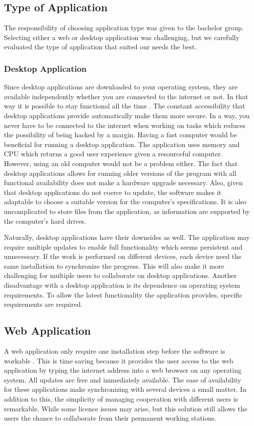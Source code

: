 \subsection{Type of Application}
The responsibility of choosing application type was given to the bachelor group. Selecting either a web or desktop application was challenging, but we carefully evaluated the type of application that suited our needs the best. 

\subsubsection*{Desktop Application}
Since desktop applications are downloaded to your operating system, they are available independently whether you are connected to the internet or not. In that way it is possible to stay functional all the time \cite{WebVsDesktop}. The constant accessibility that desktop applications provide automatically make them more secure. In a way, you never have to be connected to the internet when working on tasks which reduces the possibility of being hacked by a margin. Having a fast computer would be beneficial for running a desktop application. The application uses memory and CPU which returns a good user experience given a resourceful computer. However, using an old computer would not be a problem either. The fact that desktop applications allows for running older versions of the program with all functional availability does not make a hardware upgrade necessary. Also, given that desktop applications do not coerce to update, the software makes it adaptable to choose a suitable version for the computer's specifications. It is also uncomplicated to store files from the application, as information are supported by the computer's hard drives. 

Naturally, desktop applications have their downsides as well. The application may require multiple updates to enable full functionality which seems persistent and unnecessary. If the work is performed on different devices, each device need the same installation to synchronize the progress. This will also make it more challenging for multiple users to collaborate on desktop applications. Another disadvantage with a desktop application is its dependence on operating system requirements. To allow the latest functionality the application provides, specific requirements are required. 

\subsection*{Web Application}
A web application only require one installation step before the software is workable \cite{WebVsDesktop}. This is time saving because it provides the user access to the web application by typing the internet address into a web browser on any operating system. All updates are free and immediately available. The ease of availability for these applications make synchronizing with several devices a small matter. In addition to this, the simplicity of managing cooperation with different users is remarkable. While some licence issues may arise, but this solution still allows the users the chance to collaborate from their permanent working stations.


